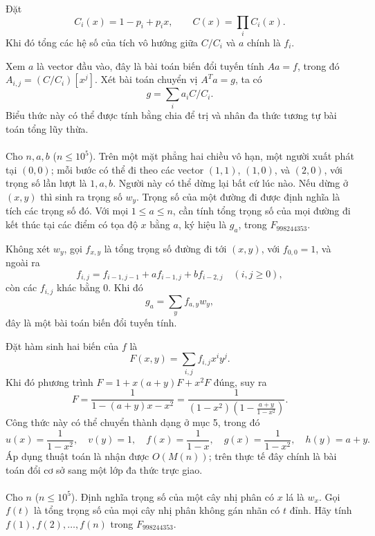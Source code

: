 \documentclass[11pt]{article}
\begin{document}
 Đặt
\[
  C_i(x)=1-p_i+p_ix,\qquad C(x)=\prod_i C_i(x).
\]
Khi đó tổng các hệ số của tích vô hướng giữa \(C/C_i\) và \(a\) chính là
\(f_i\).

Xem \(a\) là vector đầu vào, đây là bài toán biến đổi tuyến tính \(Aa=f\), trong
đó \(A_{i,j}=(C/C_i)[x^j]\). Xét bài toán chuyển vị \(A^Ta=g\), ta có
\[
  g=\sum_i a_i C/C_i.
\]
Biểu thức này có thể được tính bằng chia để trị và nhân đa thức tương tự bài
toán tổng lũy thừa.

\paragraph{}
 Cho \(n,a,b\) (\(n\le 10^5\)). Trên một mặt phẳng hai
chiều vô hạn, một người xuất phát tại \((0,0)\); mỗi bước có thể đi theo các
vector \((1,1)\), \((1,0)\), và \((2,0)\), với trọng số lần lượt là
\(1,a,b\). Người này có thể dừng lại bất cứ lúc nào. Nếu dừng ở \((x,y)\) thì
sinh ra trọng số \(w_y\). Trọng số của một đường đi được định nghĩa là tích các
trọng số đó. Với mọi \(1\le a\le n\), cần tính tổng trọng số của mọi đường đi
kết thúc tại các điểm có tọa độ \(x\) bằng \(a\), ký hiệu là \(g_a\), trong
\(F_{998244353}\).

 Không xét \(w_y\), gọi \(f_{x,y}\) là tổng trọng số đường đi
tới \((x,y)\), với \(f_{0,0}=1\), và ngoài ra
\[
  f_{i,j}=f_{i-1,j-1}+af_{i-1,j}+bf_{i-2,j}\quad(i,j\ge 0),
\]
còn các \(f_{i,j}\) khác bằng \(0\). Khi đó
\[
  g_a=\sum_y f_{a,y}w_y,
\]
đây là một bài toán biến đổi tuyến tính.

Đặt hàm sinh hai biến của \(f\) là
\[
  F(x,y)=\sum_{i,j}f_{i,j}x^iy^j.
\]
Khi đó phương trình \(F=1+x(a+y)F+x^2F\) đúng, suy ra
\[
  F=\frac{1}{1-(a+y)x-x^2}
   =\frac{1}{(1-x^2)\left(1-\frac{a+y}{1-x^2}\right)}.
\]
Công thức này có thể chuyển thành dạng ở mục 5, trong đó
\[
  u(x)=\frac{1}{1-x^2},\quad
  v(y)=1,\quad
  f(x)=\frac{1}{1-x},\quad
  g(x)=\frac{1}{1-x^2},\quad
  h(y)=a+y.
\]
Áp dụng thuật toán là nhận được \(O(M(n))\); trên thực tế đây chính là bài toán
đổi cơ sở sang một lớp đa thức trực giao.

\paragraph{}
 Cho \(n\) (\(n\le 10^5\)). Định nghĩa trọng số của một
cây nhị phân có \(x\) lá là \(w_x\). Gọi \(f(t)\) là tổng trọng số của mọi cây
nhị phân không gán nhãn có \(t\) đỉnh. Hãy tính \(f(1),f(2),\ldots,f(n)\) trong
\(F_{998244353}\).
\end{document}
